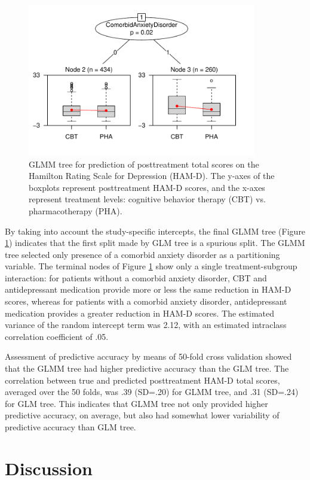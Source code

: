 \documentclass[nobf,doc]{apa}
\begin{document}
\begin{figure}[!ht]
    \includegraphics[width=10cm]{app_lmertree.pdf}
	\caption{GLMM tree for prediction of posttreatment total scores on the Hamilton Rating Scale for Depression (HAM-D). The y-axes of the boxplots represent posttreatment HAM-D scores, and the x-axes represent treatment levels: cognitive behavior therapy (CBT) vs. pharmacotherapy (PHA).}
	\label{fig:lmertree_C&W}
\end{figure}

By taking into account the study-specific intercepts, the final GLMM tree (Figure \ref{fig:lmertree_C&W}) indicates that the first split made by GLM tree is a spurious split. The GLMM tree selected only presence of a comorbid anxiety disorder as a partitioning variable. The terminal nodes of Figure \ref{fig:lmertree_C&W} show only a single treatment-subgroup interaction: for patients without a comorbid anxiety disorder, CBT and antidepressant medication provide more or less the same reduction in HAM-D scores, whereas for patients with a comorbid anxiety disorder, antidepressant medication provides a greater reduction in HAM-D scores. The estimated variance of the random intercept term was 2.12, with an estimated intraclass correlation coefficient of .05. 

Assessment of predictive accuracy by means of 50-fold cross validation showed that the GLMM tree had higher predictive accuracy than the GLM tree. The correlation between true and predicted posttreatment HAM-D total scores, averaged over the 50 folds, was .39 (SD=.20) for GLMM tree, and .31 (SD=.24) for GLM tree. This indicates that GLMM tree not only provided higher predictive accuracy, on average, but also had somewhat lower variability of predictive accuracy than GLM tree. 




\section{Discussion}
\end{document}
